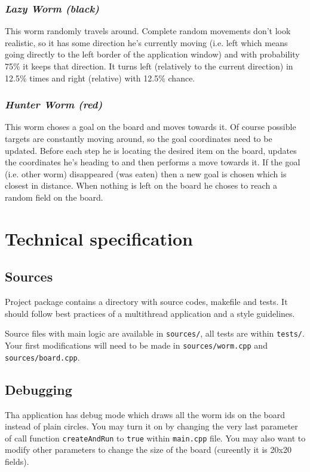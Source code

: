 \documentclass{article}
\begin{document}
\subsubsection{\textit{Lazy Worm (black)}}

This worm randomly travels around. Complete random movements don't look
realistic, so it has some direction he's currently moving
(i.e. left which means going directly to the left border of the application window)
and with probability 75\% it keeps that direction. It turns left (relatively
to the current direction) in 12.5\% times and right (relative) with 12.5\% chance.

\subsubsection{\textit{Hunter Worm (red)}}

This worm choses a goal on the board and moves towards it. Of course possible
targets are constantly moving around, so the goal coordinates need to be updated.
Before each step he is locating the desired item on the board, updates the
coordinates he's heading to and then performs a move towards it. If the goal
(i.e. other worm) disappeared (was eaten) then a new goal is chosen which is
closest in distance. When nothing is left on the board he choses to reach
a random field on the board.

\section{Technical specification}

\subsection{Sources}

Project package contains a directory with source codes, makefile and tests.
It should follow best practices of a multithread application and a style
guidelines.

Source files with main logic are available in \texttt{sources/}, all tests
are within \texttt{tests/}. Your first modifications will need to be made
in \texttt{sources/worm.cpp} and \texttt{sources/board.cpp}.

\subsection{Debugging}

Tha application has debug mode which draws all the worm ids on the board
instead of plain circles. You may turn it on by changing the very last
parameter of call function \texttt{createAndRun} to \texttt{true} within
\texttt{main.cpp} file. You may also want to modify other parameters
to change the size of the board (cureently it is 20x20 fields).
\end{document}
